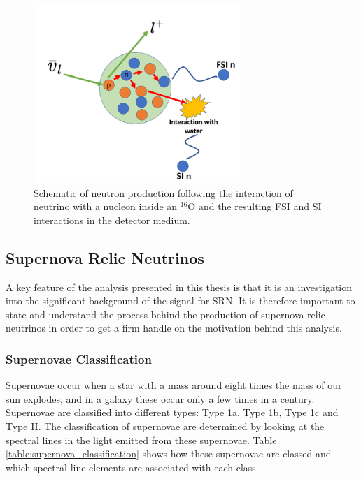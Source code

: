 \begin{figure}
    \centering
    \includegraphics[width=0.7\textwidth]{Figures/fsi_schematic.png}
    \caption{Schematic of neutron production following the interaction of neutrino with a nucleon inside an ${ }^{16} \mathrm{O}$ and the resulting FSI and SI interactions in the detector medium.}
    \label{fig:FSI_SI}
\end{figure}



\subsection{Supernova Relic Neutrinos}

A key feature of the analysis presented in this thesis is that it is an investigation into the significant background of the signal for SRN. It is therefore important to state and understand the process behind the production of supernova relic neutrinos in order to get a firm handle on the motivation behind this analysis. 

\subsubsection{Supernovae Classification}
Supernovae occur when a star with a mass around eight times the mass of our sun explodes, and in a galaxy these occur only a few times in a century. Supernovae are classified into different types: Type 1a, Type 1b, Type 1c and Type II. The classification of supernovae are determined by looking at the spectral lines in the light emitted from these supernovae. Table \ref{table:supernova_classification} shows how these supernovae are classed and which spectral line elements are associated with each class. 

